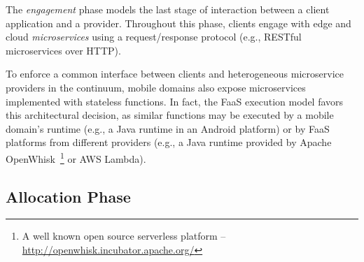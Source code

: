 The \textit{engagement} phase models the last stage of interaction between a client application and a provider. Throughout this phase, clients engage with edge and cloud \textit{microservices} using a request/response protocol (e.g., RESTful microservices over HTTP). 

To enforce a common interface between clients and heterogeneous microservice providers in the continuum, mobile domains also expose microservices implemented with stateless functions. In fact, the FaaS execution model favors this architectural decision, as similar functions may be executed by a mobile domain's runtime (e.g., a Java runtime in an Android platform) or by FaaS platforms from different providers (e.g., a Java runtime provided by Apache OpenWhisk~\footnote{A well known open source serverless platform -- \url{http://openwhisk.incubator.apache.org/}} or AWS Lambda).








\subsection*{Allocation Phase}\label{sec:A3-E-allocation}

